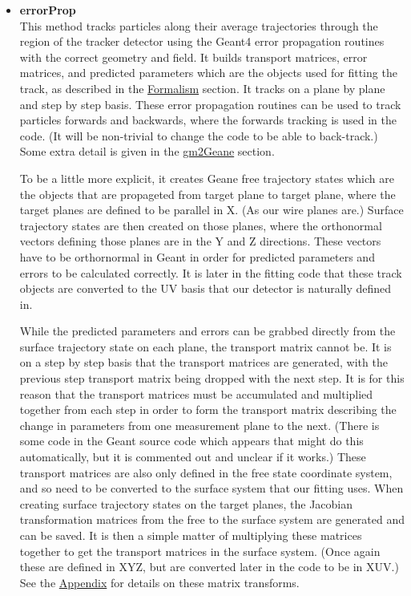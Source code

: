 \begin{enumerate}
\begin{itemize}
          \item{\bf{errorProp}} \\ 
          This method tracks particles along their average trajectories through the region of the tracker detector using the Geant4 error propagation routines with the correct geometry and field. It builds transport matrices, error matrices, and predicted parameters which are the objects used for fitting the track, as described in the \hyperref[sec:Formalism]{Formalism} section. It tracks on a plane by plane and step by step basis. These error propagation routines can be used to track particles forwards and backwards, where the forwards tracking is used in the code. (It will be non-trivial to change the code to be able to back-track.) Some extra detail is given in the \hyperref[sec:gm2Geane]{gm2Geane} section.

          To be a little more explicit, it creates Geane free trajectory states which are the objects that are propageted from target plane to target plane, where the target planes are defined to be parallel in X. (As our wire planes are.) Surface trajectory states are then created on those planes, where the orthonormal vectors defining those planes are in the Y and Z directions. These vectors have to be orthornormal in Geant in order for predicted parameters and errors to be calculated correctly. It is later in the fitting code that these track objects are converted to the UV basis that our detector is naturally defined in. 
            
          While the predicted parameters and errors can be grabbed directly from the surface trajectory state on each plane, the transport matrix cannot be. It is on a step by step basis that the transport matrices are generated, with the previous step transport matrix being dropped with the next step. It is for this reason that the transport matrices must be accumulated and multiplied together from each step in order to form the transport matrix describing the change in parameters from one measurement plane to the next. (There is some code in the Geant source code which appears that might do this automatically, but it is commented out and unclear if it works.) These transport matrices are also only defined in the free state coordinate system, and so need to be converted to the surface system that our fitting uses. When creating surface trajectory states on the target planes, the Jacobian transformation matrices from the free to the surface system are generated and can be saved. It is then a simple matter of multiplying these matrices together to get the transport matrices in the surface system. (Once again these are defined in XYZ, but are converted later in the code to be in XUV.) See the \hyperref[sec:MatTransf]{Appendix} for details on these matrix transforms.


\end{itemize}
\end{enumerate}
